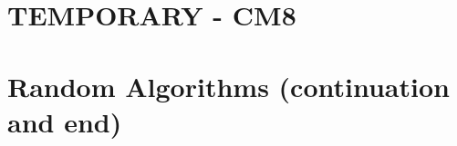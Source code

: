 \part*{TEMPORARY - CM8}

%
%
%
%
%
%
%
%
%
%
%
%
%
%

\part*{Random Algorithms (continuation and end)}
\paragraph{}

